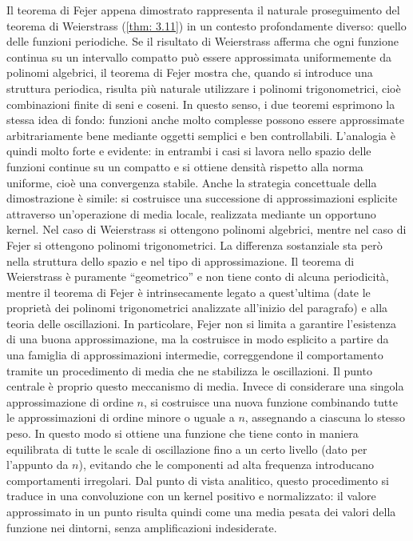 \documentclass[a4paper,12pt]{report}
\begin{document}
\newpage

Il teorema di Fejer appena dimostrato rappresenta il naturale proseguimento del teorema di Weierstrass (\ref{thm: 3.11}) in un contesto profondamente diverso: quello delle funzioni periodiche. Se il risultato di Weierstrass afferma che ogni funzione continua su un intervallo compatto può essere approssimata uniformemente da polinomi algebrici, il teorema di Fejer mostra che, quando si introduce una struttura periodica, risulta più naturale utilizzare i polinomi trigonometrici, cioè combinazioni finite di seni e coseni. In questo senso, i due teoremi esprimono la stessa idea di fondo: funzioni anche molto complesse possono essere approssimate arbitrariamente bene mediante oggetti semplici e ben controllabili.
L’analogia è quindi molto forte e evidente: in entrambi i casi si lavora nello spazio delle funzioni continue su un compatto e si ottiene densità rispetto alla norma uniforme, cioè una convergenza stabile. Anche la strategia concettuale della dimostrazione è simile: si costruisce una successione di approssimazioni esplicite attraverso un’operazione di media locale, realizzata mediante un opportuno kernel. Nel caso di Weierstrass si ottengono polinomi algebrici, mentre nel caso di Fejer si ottengono polinomi trigonometrici.
La differenza sostanziale sta però nella struttura dello spazio e nel tipo di approssimazione. Il teorema di Weierstrass è puramente “geometrico” e non tiene conto di alcuna periodicità, mentre il teorema di Fejer è intrinsecamente legato a quest'ultima (date le proprietà dei polinomi trigonometrici analizzate all'inizio del paragrafo) e alla teoria delle oscillazioni. In particolare, Fejer non si limita a garantire l’esistenza di una buona approssimazione, ma la costruisce in modo esplicito a partire da una famiglia di approssimazioni intermedie, correggendone il comportamento tramite un procedimento di media che ne stabilizza le oscillazioni.
Il punto centrale è proprio questo meccanismo di media. Invece di considerare una singola approssimazione di ordine $n$, si costruisce una nuova funzione combinando tutte le approssimazioni di ordine minore o uguale a $n$, assegnando a ciascuna lo stesso peso. In questo modo si ottiene una funzione che tiene conto in maniera equilibrata di tutte le scale di oscillazione fino a un certo livello (dato per l'appunto da $n$), evitando che le componenti ad alta frequenza introducano comportamenti irregolari. Dal punto di vista analitico, questo procedimento si traduce in una convoluzione con un kernel positivo e normalizzato: il valore approssimato in un punto risulta quindi come una media pesata dei valori della funzione nei dintorni, senza amplificazioni indesiderate.
\end{document}
